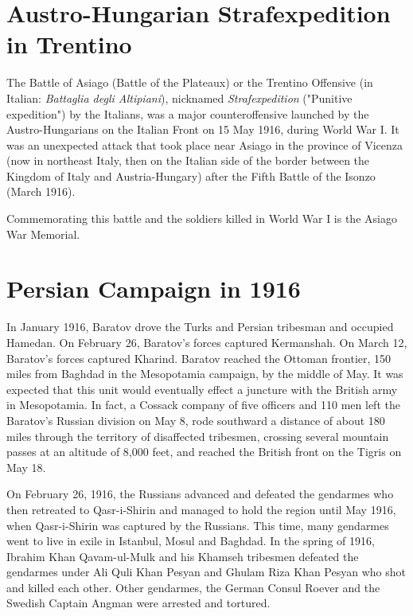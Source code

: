 \documentclass[a4paper,]{book}
\begin{document}
\section{Austro-Hungarian Strafexpedition in Trentino}

The Battle of Asiago (Battle of the Plateaux) or the Trentino Offensive (in Italian: \textit{Battaglia degli Altipiani}), nicknamed \textit{Strafexpedition} ("Punitive expedition") by the Italians, was a major counteroffensive launched by the Austro-Hungarians on the Italian Front on 15 May 1916, during World War I. It was an unexpected attack that took place near Asiago in the province of Vicenza (now in northeast Italy, then on the Italian side of the border between the Kingdom of Italy and Austria-Hungary) after the Fifth Battle of the Isonzo (March 1916).

Commemorating this battle and the soldiers killed in World War I is the Asiago War Memorial.

\section{Persian Campaign in 1916}

In January 1916, Baratov drove the Turks and Persian tribesman and occupied Hamedan. On February 26, Baratov's forces captured Kermanshah. On March 12, Baratov's forces captured Kharind. Baratov reached the Ottoman frontier, 150 miles from Baghdad in the Mesopotamia campaign, by the middle of May. It was expected that this unit would eventually effect a juncture with the British army in Mesopotamia. In fact, a Cossack company of five officers and 110 men left the Baratov's Russian division on May 8, rode southward a distance of about 180 miles through the territory of disaffected tribesmen, crossing several mountain passes at an altitude of 8,000 feet, and reached the British front on the Tigris on May 18.

On February 26, 1916, the Russians advanced and defeated the gendarmes who then retreated to Qasr-i-Shirin and managed to hold the region until May 1916, when Qasr-i-Shirin was captured by the Russians. This time, many gendarmes went to live in exile in Istanbul, Mosul and Baghdad. In the spring of 1916, Ibrahim Khan Qavam-ul-Mulk and his Khamseh tribesmen defeated the gendarmes under Ali Quli Khan Pesyan and Ghulam Riza Khan Pesyan who shot and killed each other. Other gendarmes, the German Consul Roever and the Swedish Captain Angman were arrested and tortured.
\end{document}
